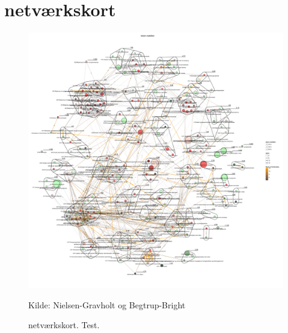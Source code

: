 
\newpage \chapter{netværkskort \label{app_netvaerkskort}}



\begin{figure}[H]
\begin{center}
	\caption{netværkskort. Test.}
	\includegraphics[width=1.0\textwidth]{fig/netvaerkskort/kort_intern_mob.pdf}
	\centerline{ \tiny{Kilde: Nielsen-Gravholt og Begtrup-Bright}}
\end{center}
\end{figure}
\restoregeometry